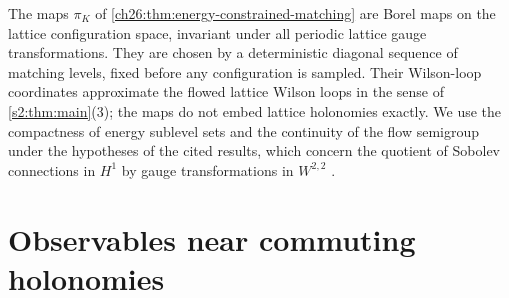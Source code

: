 The maps $\pi_K$ of \cref{ch26:thm:energy-constrained-matching} are Borel maps on the lattice configuration space, invariant under all periodic lattice gauge transformations. They are chosen by a deterministic diagonal sequence of matching levels, fixed before any configuration is sampled. Their Wilson-loop coordinates approximate the flowed lattice Wilson loops in the sense of \cref{s2:thm:main}(3); the maps do not embed lattice holonomies exactly. We use the compactness of energy sublevel sets and the continuity of the flow semigroup under the hypotheses of the cited results, which concern the quotient of Sobolev connections in $H^1$ by gauge transformations in $W^{2,2}$ \cite[Theorem~3.51, pp.~35--36; Lemma~3.68, p.~40]{CCState2023v4}.

\section{Observables near commuting holonomies}\label{ch01:sec:weak}

